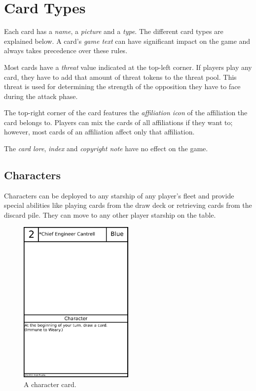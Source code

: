 \documentclass[11pt, a4paper]{article}
\begin{document}
\section{Card Types}

Each card has a \emph{name}, a \emph{picture} and a \emph{type}. The different
card types are explained below. A card's \emph{game text} can have significant
impact on the game and always takes precedence over these rules.

Most cards have a \emph{threat} value indicated at the top-left corner. If
players play any card, they have to add that amount of threat tokens to the
threat pool. This threat is used for determining the strength of the opposition
they have to face during the attack phase.

The top-right corner of the card features the \emph{affiliation icon} of the
affiliation the card belongs to. Players can mix the cards of all affiliations
if they want to; however, most cards of an affiliation affect only that
affiliation.

The \emph{card lore}, \emph{index} and \emph{copyright note} have no effect on
the game.

\subsection{Characters}

Characters can be deployed to any starship of any player's fleet and provide
special abilities like playing cards from the draw deck or retrieving cards from
the discard pile. They can move to any other player starship on the table.

\begin{figure}
  \centering
  \includegraphics[width=0.5\textwidth]{examplecharacter.png}
  \caption{A character card.}
\end{figure}
\end{document}
